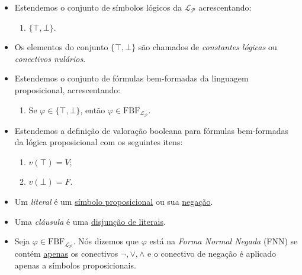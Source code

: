         \begin{itemize}[left=0.5cm, align=left, nosep]
            
            \item Estendemos o conjunto de símbolos lógicos da $\mathcal{L_P}$ acrescentando:
            \begin{enumerate}[start=4, left=0.5cm, align=left, nosep]
                \item $\{\top, \bot\}$.
            \end{enumerate}
            
            \item Os elementos do conjunto $\{\top, \bot\}$ são chamados de \textit{constantes lógicas} ou \textit{conectivos 
            nulários}.
            \item Estendemos o conjunto de fórmulas bem-formadas da linguagem proposicional, acrescentando:
            \begin{enumerate}[start=4, left=0.5cm, align=left, nosep]
                \item Se $\varphi \in \{\top, \bot\}$, então $\varphi \in \text{FBF}_{\mathcal{L_P}}$.
            \end{enumerate}

            \item Estendemos a definição de valoração booleana para fórmulas bem-formadas da lógica proposicional com os seguintes 
            itens:
            \begin{enumerate}[start=7, left=0.5cm, align=left, nosep]
                \item $v(\top) = V$;
                \item $v(\bot) = F$.
            \end{enumerate}

            \item Um \textit{literal} é um \underline{símbolo proposicional} ou sua \underline{negação}.
            \item Uma \textit{cláusula} é uma \underline{disjunção de literais}.
        
            \item Seja $\varphi \in \text{FBF}_{\mathcal{L_P}}$. Nós dizemos que $\varphi$ está na \textit{Forma Normal Negada} 
            (FNN) se contém \underline{apenas} os conectivos $\neg, \vee, \wedge$ e o conectivo de negação é aplicado apenas a 
            símbolos proposicionais.


\end{itemize}
